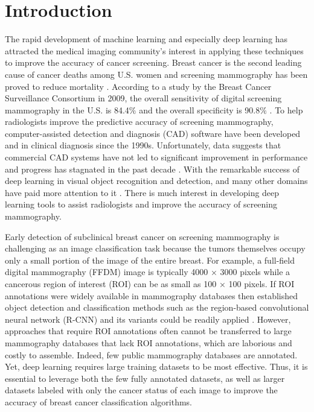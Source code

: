 \section{Introduction}
\label{sec:Intro}

The rapid development of machine learning and 
especially deep learning has attracted the medical 
imaging community’s interest in applying these 
techniques to improve the accuracy of cancer 
screening. Breast cancer is the second leading 
cause of cancer deaths among U.S. women and 
screening mammography has been proved to reduce 
mortality
\cite{Oeffinger2015,Zhu2019}.
According to a study by the Breast 
Cancer Surveillance Consortium in 2009, the 
overall sensitivity of digital screening mammography 
in the U.S. is 84.4$\%$ and the overall specificity 
is 90.8$\%$
\cite{Jamieson2012}.
To help radiologists improve 
the predictive accuracy of screening mammography, 
computer-assisted detection and diagnosis (CAD) 
software have been developed and in clinical 
diagnosis since the 1990s. Unfortunately, data 
suggests that commercial CAD systems have not led 
to significant improvement in performance and 
progress has stagnated in the past decade
\cite{Girshick2015}.
With the remarkable success of deep learning in 
visual object recognition and detection, and many 
other domains have paid more attention to it
\cite{Lecun2015}.
There is much interest in developing deep 
learning tools to assist radiologists and improve 
the accuracy of screening mammography. 

Early detection of subclinical breast cancer on 
screening mammography is challenging as an image
classification task because the tumors themselves 
occupy only a small portion of the image of the
entire breast. For example, a full-field digital 
mammography (FFDM) image is typically 4000 × 3000
pixels while a cancerous region of interest (ROI) 
can be as small as 100 × 100 pixels. If ROI
annotations were widely available in mammography 
databases then established object detection and
classification methods such as the region-based 
convolutional neural network (R-CNN) and its
variants could be readily applied
\cite{Girshick2014,Girshick2015,Ren2017}.
However, approaches that require ROI annotations 
\cite{Dai2016}
often cannot be transferred to large mammography 
databases that lack ROI annotations, which are
laborious and costly to assemble. Indeed, few 
public mammography databases are annotated.
Yet, deep learning requires large training datasets 
to be most effective. Thus, it is essential to 
leverage both the few fully annotated datasets, as 
well as larger datasets labeled with only the 
cancer status of each image to improve the accuracy 
of breast cancer classification algorithms.

